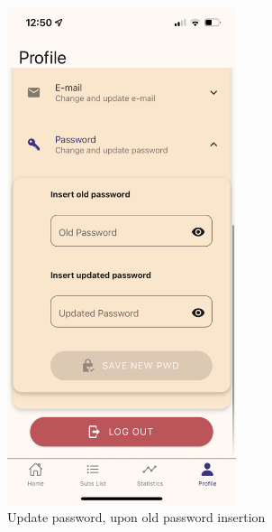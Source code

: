 \documentclass[12pt]{article}
\begin{document}
\begin{figure}[h!]
    \centering
    \begin{minipage}[c]{0.45\textwidth}
        \centering
        \includegraphics[width=0.6\textwidth, clip]{../../assets/smartphone/profileNewPwd.PNG}
        \caption{Update password, upon old password insertion}
        \label{fig:profileNewPwd}
    \end{minipage}\hspace{1cm}%
    \begin{minipage}[c]{0.45\textwidth}
        \centering

\end{minipage}
\end{figure}
\end{document}

